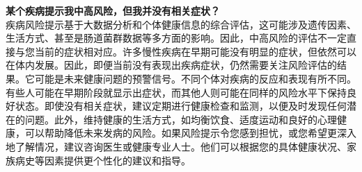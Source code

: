 \documentclass[UTF8]{ctexart}
\begin{document}
\begin{tcolorbox}[
    enhanced,
    colback=lightpurple!10, %
    colframe=lightpurple!10,  %
    arc=3mm,
    boxrule=0.5pt,
    width=\textwidth,
    top=8pt,
    bottom=8pt
]
{\small{\color{lightpurple}\faQuestionCircle}\quad \textbf{某个疾病提示我中高风险，但我并没有相关症状？}\\
{\color{orange!50}\faComments}\quad 疾病风险提示基于大数据分析和个体健康信息的综合评估，这可能涉及遗传因素、生活方式、甚至是肠道菌群数据等多方面的影响。因此，中高风险的评估不一定直接与您当前的症状相对应。许多慢性疾病在早期可能没有明显的症状，但依然可以在体内发展。因此，即便当前没有表现出疾病症状，仍然需要关注风险评估的结果。它可能是未来健康问题的预警信号。不同个体对疾病的反应和表现有所不同。有些人可能在早期阶段就显示出症状，而其他人则可能在同样的风险水平下保持良好状态。即使没有相关症状，建议定期进行健康检查和监测，以便及时发现任何潜在的问题。此外，维持健康的生活方式，如均衡饮食、适度运动和良好的心理健康，可以帮助降低未来发病的风险。如果风险提示令您感到担忧，或您希望更深入地了解情况，建议咨询医生或健康专业人士。他们可以根据您的具体健康状况、家族病史等因素提供更个性化的建议和指导。


}
\end{tcolorbox}
\end{document}
